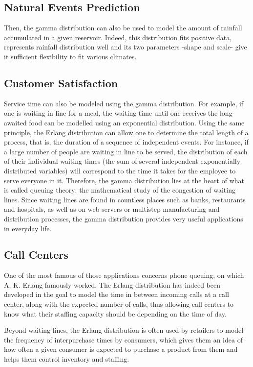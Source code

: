 \documentclass[12pt]{article}
\begin{document}
\subsection{Natural Events Prediction}
Then, the gamma distribution can also be used to model the amount of rainfall accumulated in a given reservoir. Indeed,
this distribution fits positive data, represents rainfall distribution well and its two parameters -shape and scale-
give it sufficient flexibility to fit various climates\cite{husakUseGammaDistribution2007}.

\subsection{Customer Satisfaction}
Service time can also be modeled using the gamma distribution. For example, if one is waiting in line for a meal, the
waiting time until one receives the long-awaited food can be modelled using an exponential distribution. Using the same
principle, the Erlang distribution can allow one to determine the total length of a process, that is, the duration of a
sequence of independent events. For instance, if a large number of people are waiting in line to be served, the
distribution of each of their individual waiting times (the sum of several independent exponentially distributed
variables) will correspond to the time it takes for the employee to serve everyone in it. Therefore, the gamma
distribution lies at the heart of what is called queuing theory: the mathematical study of the congestion of waiting
lines. Since waiting lines are found in countless places such as banks, restaurants and hospitals, as well as on web
servers or multistep manufacturing and distribution processes, the gamma distribution provides very useful applications
in everyday life.

\subsection{Call Centers}
One of the most famous of those applications concerns phone queuing, on which A. K. Erlang famously worked. The Erlang
distribution has indeed been developed in the goal to model the time in between incoming calls at a call center, along
with the expected number of calls, thus allowing call centers to know what their staffing capacity should be depending
on the time of day.

Beyond waiting lines, the Erlang distribution is often used by retailers to model the frequency of interpurchase times
by consumers, which gives them an idea of how often a given consumer is expected to purchase a product from them and
helps them control inventory and staffing.
\end{document}
